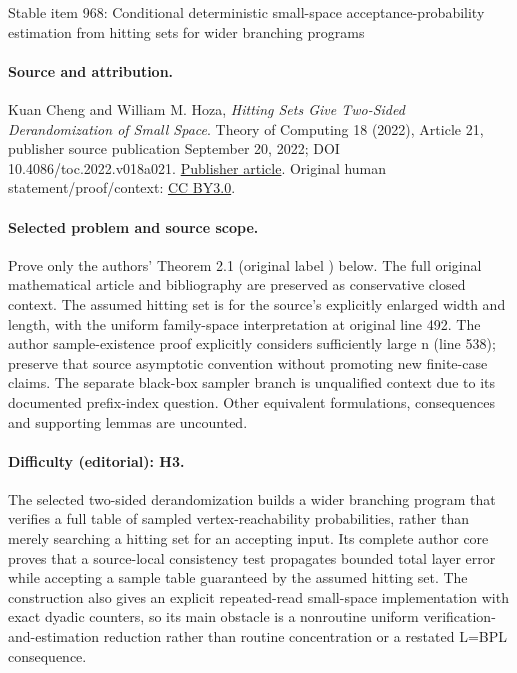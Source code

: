 \documentclass[11pt]{article}
\numberwithin{equation}{section}
\theoremstyle{definition}
\theoremstyle{plain}
\begin{document}
\begin{center}{\Large Stable item 968: Conditional deterministic small-space acceptance-probability estimation from hitting sets for wider branching programs}\end{center}
\paragraph{Source and attribution.}
Kuan Cheng and William M. Hoza, \emph{Hitting Sets Give Two-Sided Derandomization of Small Space}. Theory of Computing 18 (2022), Article 21, publisher source publication September 20, 2022; DOI 10.4086/toc.2022.v018a021. \href{https://theoryofcomputing.org/articles/v018a021/}{Publisher article}. Original human statement/proof/context: \href{https://creativecommons.org/licenses/by/3.0/}{CC BY3.0}.
\paragraph{Selected problem and source scope.}
Prove only the authors' Theorem 2.1 (original label ) below. The full original mathematical article and bibliography are preserved as conservative closed context. The assumed hitting set is for the source's explicitly enlarged width and length, with the uniform family-space interpretation at original line 492. The author sample-existence proof explicitly considers sufficiently large n (line 538); preserve that source asymptotic convention without promoting new finite-case claims. The separate black-box sampler branch is unqualified context due to its documented prefix-index question. Other equivalent formulations, consequences and supporting lemmas are uncounted.
\paragraph{Difficulty (editorial): H3.}
The selected two-sided derandomization builds a wider branching program that verifies a full table of sampled vertex-reachability probabilities, rather than merely searching a hitting set for an accepting input. Its complete author core proves that a source-local consistency test propagates bounded total layer error while accepting a sample table guaranteed by the assumed hitting set. The construction also gives an explicit repeated-read small-space implementation with exact dyadic counters, so its main obstacle is a nonroutine uniform verification-and-estimation reduction rather than routine concentration or a restated L=BPL consequence.
\end{document}
